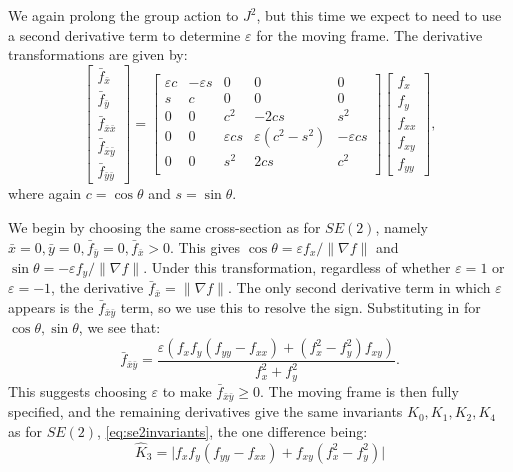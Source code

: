 \documentclass{artjlt}
\begin{document}
We again prolong the group action to $J^2$, but this time we expect to need
to use a second derivative term to determine $\varepsilon$ for the moving
frame. The derivative transformations are given by:
\begin{equation}
  \begin{bmatrix}
  \bar f_{\bar x} \\ \bar f_{\bar y} \\ \bar f_{\bar{x}\bar{x}} \\ \bar f_{\bar{x}\bar{y}} \\ \bar f_{\bar{y}\bar{y}}
  \end{bmatrix} = 
  \begin{bmatrix}
 \varepsilon c & -\varepsilon s & 0 & 0 & 0 \\
 s & c & 0 & 0 & 0 \\
0 & 0 & c^2 & -2cs & s^2 \\
0 & 0 & \varepsilon cs & \varepsilon(c^2 - s^2) & -\varepsilon cs \\
0 & 0 & s^2 & 2cs & c^2 \\
  \end{bmatrix}
  \begin{bmatrix}
f_x \\ f_y \\ f_{xx} \\ f_{xy} \\ f_{yy} 
  \end{bmatrix},
\label{eqn:E2prolongation}
\end{equation}
where again $c = \cos\theta$ and $s = \sin\theta$.  

We begin by choosing the same cross-section as for $SE(2)$, namely $\bar{x} = 0,
\bar{y} = 0, \bar{f}_{\bar{y}} = 0, \bar{f}_{\bar{x}} > 0$. This gives
$\cos\theta = \varepsilon f_x / \lVert \nabla f \rVert$ and $\sin\theta =
-\varepsilon f_y / \lVert \nabla f \rVert$. Under this transformation,
regardless of whether $\varepsilon = 1$ or $\varepsilon = -1$, the
derivative $\bar{f}_{\bar{x}} = \lVert \nabla f \rVert$. 
The only second derivative term in which $\varepsilon$ appears is
the $\bar{f}_{\bar{x}\bar{y}}$ term, so we use this to resolve the sign. Substituting in for $\cos\theta,
\sin\theta$, we see that:
\begin{equation*}
    \bar{f}_{\bar{x}\bar{y}} = \frac{\varepsilon(f_xf_y(f_{yy} - f_{xx}) + (f_x^2 -
    f_y^2)f_{xy})}{f_x^2 + f_y^2}.
\end{equation*}
This suggests choosing $\varepsilon$ to make $\bar{f}_{\bar{x}\bar{y}} \ge
0$. The moving frame is then fully specified, and the remaining derivatives
give the same invariants $K_0, K_1, K_2, K_4$ as for $SE(2)$,
\eqref{eq:se2invariants}, the one difference being:
\begin{equation}\label{eq:e2invariants}
    \hat{K}_3 = \lvert f_x f_y (f_{yy} - f_{xx}) + f_{xy} (f_x^2 - f_y^2)\rvert
\end{equation}
\end{document}
